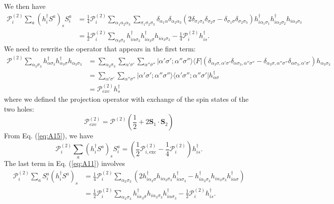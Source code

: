 \documentclass[11pt, a4paper]{article}
\begin{document}
We then have
\begin{align}
\mathcal{P}_i^{(2)} \sum_a (h_i^{\dagger} S^a)_s S_i^a &= \frac{1}{4} \mathcal{P}_i^{(2)} \sum_{\alpha_1 \alpha_2 \alpha_3} \sum_{\sigma_1 \sigma_2 \sigma_3} \delta_{\alpha_1 \alpha} \delta_{\alpha_2 \alpha_3} (2\delta_{\sigma_1 \sigma_3} \delta_{\sigma_2 \sigma} - \delta_{\sigma_1 \sigma} \delta_{\sigma_2 \sigma_3}) h_{i\alpha_1 \sigma_1}^{\dagger} h_{i\alpha_2 \sigma_2}^{\dagger} h_{i\alpha_3 \sigma_3} \nonumber \\
&= \frac{1}{2} \mathcal{P}_i^{(2)} \sum_{\alpha_3 \sigma_3} h_{i\alpha\sigma_3}^{\dagger} h_{i\alpha_3 \sigma}^{\dagger} h_{i\alpha_3 \sigma_3} - \frac{1}{4} \mathcal{P}_i^{(2)} h_{is}^{\dagger}. \label{eq:A15}
\end{align}
We need to rewrite the operator that appears in the first term:
\begin{align}
\mathcal{P}^{(2)} \sum_{\alpha_3 \sigma_3} h_{\alpha\sigma_3}^{\dagger} h_{\alpha_3 \sigma}^{\dagger} h_{\alpha_3 \sigma_3} &= \sum_{\alpha_3 \sigma_3} \sum_{\alpha' \sigma'} \sum_{\alpha'' \sigma''} |\alpha' \sigma'; \alpha'' \sigma''\rangle \langle F| (\delta_{\alpha_3 \sigma, \alpha' \sigma'} \delta_{\alpha \sigma_3, \alpha'' \sigma''} - \delta_{\alpha_3 \sigma, \alpha'' \sigma''} \delta_{\alpha \sigma_3, \alpha' \sigma'}) h_{\alpha_3 \sigma_3} \nonumber \\
&= \sum_{\alpha' \sigma'} \sum_{\alpha'' \sigma''} |\alpha' \sigma'; \alpha'' \sigma''\rangle \langle \alpha' \sigma''; \alpha'' \sigma'| h_{\alpha \sigma}^{\dagger} \nonumber \\
&= \mathcal{P}_{exc}^{(2)} h_s^{\dagger} \label{eq:A16}
\end{align}
where we defined the projection operator with exchange of the spin states of the two holes:
\begin{equation}
\mathcal{P}_{exc}^{(2)} = \mathcal{P}^{(2)} \left(\frac{1}{2} + 2\bm{S}_1 \cdot \bm{S}_2\right) \label{eq:A17}
\end{equation}
From Eq. (\ref{eq:A15}), we have
\begin{equation}
\mathcal{P}_i^{(2)} \sum_a (h_i^{\dagger} S^a)_s S_i^a = \left( \frac{1}{2} \mathcal{P}_{i, \text{exc}}^{(2)} - \frac{1}{4} \mathcal{P}_i^{(2)} \right) h_{is}^{\dagger}. \label{eq:A18}
\end{equation}
The last term in Eq. (\ref{eq:A11}) involves
\begin{align}
\mathcal{P}_i^{(2)} \sum_a S_i^a (h_i^{\dagger} S^a)_s &= \frac{1}{4} \mathcal{P}_i^{(2)} \sum_{\alpha_3 \sigma_3} (2 h_{i\alpha_3 \sigma}^{\dagger} h_{i\alpha_3 \sigma_3} h_{i\alpha \sigma_3}^{\dagger} - h_{i\alpha_3 \sigma_3}^{\dagger} h_{i\alpha_3 \sigma_3} h_{i\alpha \sigma}^{\dagger}) \nonumber \\
&= \frac{1}{2} \mathcal{P}_i^{(2)} \sum_{\alpha_3 \sigma_3} h_{i\alpha_3 \sigma}^{\dagger} h_{i\alpha_3 \sigma_3} h_{i\alpha \sigma_3}^{\dagger} - \frac{1}{2} \mathcal{P}_i^{(2)} h_{is}^{\dagger}. \label{eq:A19}
\end{align}
\end{document}
